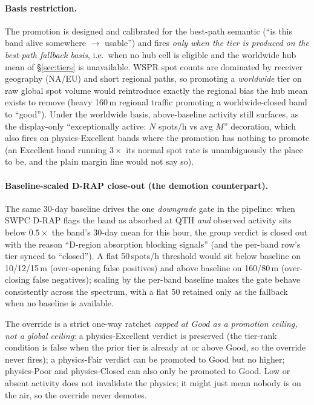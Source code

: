 \documentclass[11pt,a4paper]{article}
\begin{document}
\paragraph{Basis restriction.}  The promotion is designed and
calibrated for the best-path semantic (``is this band alive
somewhere $\to$ usable'') and fires \emph{only when the tier is
produced on the best-path fallback basis}, i.e.\ when no hub
cell is eligible and the worldwide hub mean of
\S\ref{sec:tiers} is unavailable.  WSPR spot counts are dominated
by receiver geography (NA/EU) and short regional paths, so
promoting a \emph{worldwide} tier on raw global spot volume would
reintroduce exactly the regional bias the hub mean exists to
remove (heavy 160\,m regional traffic promoting a
worldwide-closed band to ``good'').  Under the worldwide basis,
above-baseline activity still surfaces, as the display-only
``exceptionally active: $N$ spots/h vs avg $M$'' decoration,
which also fires on physics-Excellent bands where the promotion
has nothing to promote (an Excellent band running $3\times$ its
normal spot rate is unambiguously the place to be, and the plain
margin line would not say so).

\paragraph{Baseline-scaled D-RAP close-out (the demotion
counterpart).}  The same 30-day baseline drives the one
\emph{downgrade} gate in the pipeline: when SWPC D-RAP flags the
band as absorbed at QTH \emph{and} observed activity sits below
$0.5\times$ the band's 30-day mean for this hour, the group
verdict is closed out with the reason ``D-region absorption
blocking signals'' (and the per-band row's tier synced to
``closed'').  A flat 50\,spots/h threshold would
sit below baseline on 10/12/15\,m (over-opening false positives)
and above baseline on 160/80\,m (over-closing false negatives);
scaling by the per-band baseline makes the gate behave
consistently across the spectrum, with a flat 50 retained only
as the fallback when no baseline is available.

The override is a strict one-way ratchet \emph{capped at Good as a
promotion ceiling, not a global ceiling}: a physics-Excellent
verdict is preserved (the tier-rank condition is false when the
prior tier is already at or above Good, so the override never
fires); a physics-Fair verdict can be promoted to Good but no
higher; physics-Poor and physics-Closed can also only be promoted
to Good. Low or absent activity does not invalidate the physics;
it might just mean nobody is on the air, so the override never
demotes.
\end{document}
